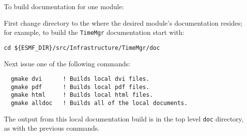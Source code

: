 \noindent To build documentation for one module:

\noindent First change directory to the where the desired module's documentation resides;  for
example, to build the {\tt TimeMgr} documentation start with:

\begin{verbatim}
cd ${ESMF_DIR}/src/Infrastructure/TimeMgr/doc
\end{verbatim}

\noindent Next issue one of the following commands:
\begin{verbatim}
  gmake dvi      ! Builds local dvi files.
  gmake pdf      ! Builds local pdf files.
  gmake html     ! Builds local html files.
  gmake alldoc   ! Builds all of the local documents.
\end{verbatim}

\noindent The output from this local documentation build is in the top level {\tt doc}
directory, as with the previous commands.






